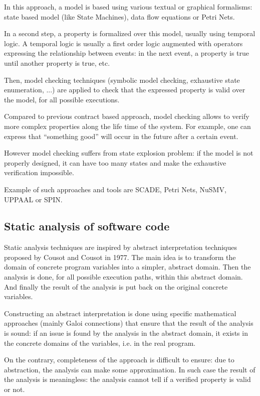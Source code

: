 In this approach, a model is based using various textual or graphical
formalisms: state based model (like State Machines), data flow
equations or Petri Nets.

In a second step, a property is formalized over this model, usually
using temporal logic. A temporal logic is usually a first order logic
augmented with operators expressing the relationship between events:
in the next event, a property is true until another property is true,
etc.

Then, model checking techniques (symbolic model checking, exhaustive
state enumeration, ...) are applied to check that the expressed
property is valid over the model, for all possible executions.

Compared to previous contract based approach, model checking allows to
verify more complex properties along the life time of the system. For
example, one can express that ``something good'' will occur in the
future after a certain event.

However model checking suffers from state explosion problem: if the
model is not properly designed, it can have too many states and make
the exhaustive verification impossible.

Example of such approaches and tools are SCADE, Petri Nets, NuSMV,
UPPAAL or SPIN.

\subsection{Static analysis of software code}

Static analysis techniques are inspired by abstract interpretation
techniques proposed by Cousot and Cousot in 1977. The main idea is to
transform the domain of concrete program variables into a simpler,
abstract domain. Then the analysis is done, for all possible execution
paths, within this abstract domain. And finally the result of the
analysis is put back on the original concrete variables.

Constructing an abstract interpretation is done using specific
mathematical approaches (mainly Galoi connections) that ensure that
the result of the analysis is sound: if an issue is found by the
analysis in the abstract domain, it exists in the concrete domains of
the variables, i.e. in the real program.

On the contrary, completeness of the approach is difficult to ensure:
due to abstraction, the analysis can make some approximation. In such
case the result of the analysis is meaningless: the analysis cannot
tell if a verified property is valid or not.


